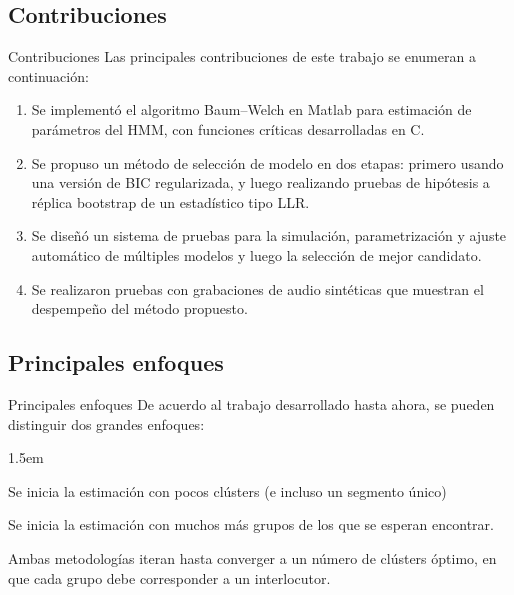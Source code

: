 \subsection{Contribuciones}

\begin{frame}{Contribuciones}
  Las principales contribuciones de este trabajo se enumeran a continuación:

  \begin{enumerate}
    \itemsep1em
    \item Se implementó el algoritmo Baum–Welch en Matlab para estimación de parámetros del HMM, con funciones críticas desarrolladas en C.

    \item Se propuso un método de selección de modelo en dos etapas: primero usando una versión de BIC regularizada, y luego realizando pruebas de hipótesis a réplica bootstrap de un estadístico tipo LLR.

    \item Se diseñó un sistema de pruebas para la simulación, parametrización y ajuste automático de múltiples modelos y luego la selección de mejor candidato.

    \item Se realizaron pruebas con grabaciones de audio sintéticas que muestran el despempeño del método propuesto.
  \end{enumerate}
\end{frame}


\subsection{Principales enfoques}

\begin{frame}{Principales enfoques}
  De acuerdo al trabajo desarrollado hasta ahora, se pueden distinguir dos grandes enfoques:
  
  \begin{description}
    \itemsep1.5em
    \item[\textit{Bottom-up:}]
      Se inicia la estimación con pocos clústers (e incluso un segmento único)
    \item[\textit{Top-down:}]
      Se inicia la estimación con muchos más grupos de los que se esperan encontrar.
  \end{description}

   Ambas metodologías iteran hasta converger a un número de clústers óptimo, en que cada grupo debe corresponder a un interlocutor.
\end{frame}    

